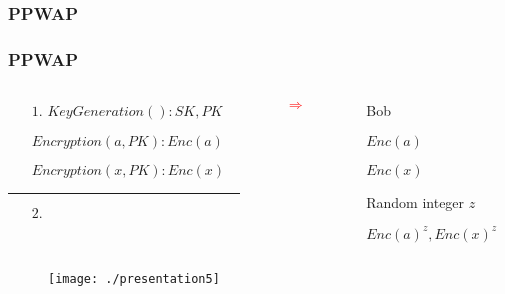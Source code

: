 \documentclass[xcolor=table]{beamer}
\newcommand{\red}[1]{\textcolor{red}{#1}}
\begin{document}
\begin{frame}
\frametitle{PPWAP}
\frametitle{PPWAP}
\begin{columns}

\begin{column}{6cm}
\begin{itemize} \itemsep1pt \parskip0pt 
  \item[] \hspace{16mm}{Alice} \newline
  \item[$1.$] $KeyGeneration(): SK, PK$
  \item[] $Encryption(a ,PK): Enc(a)$
  \item[] $Encryption(x ,PK): Enc(x)$
\end{itemize}
\noindent\rule{12cm}{0.4pt}
\begin{itemize} \itemsep1pt \parskip0pt 
  \item[$2.$] 
\end{itemize}
\end{column}
\begin{column}{1cm}
\begin{itemize} \itemsep1pt \parskip0pt 
  \item[] \red{\Huge $\Rightarrow $}
\end{itemize}
\vspace{1 cm}
\end{column}
\begin{column}{4cm}
\begin{itemize} \itemsep1pt \parskip0pt 
  \item[] 
  \item[] Bob
  \item[] 
  \item[] $Enc(a)$
  \item[] $Enc(x)$
\end{itemize}
\vspace{6mm}
\begin{itemize} \itemsep1pt \parskip0pt 
  \item[] 
  \item[] Random integer $z$
  \item[] $Enc(a)^z, Enc(x)^z$
\end{itemize}
\end{column}
\end{columns}

\begin{figure}[H]
  \centering
  \texttt{[image: ./presentation5]}
\end{figure}




\end{frame}
\end{document}
